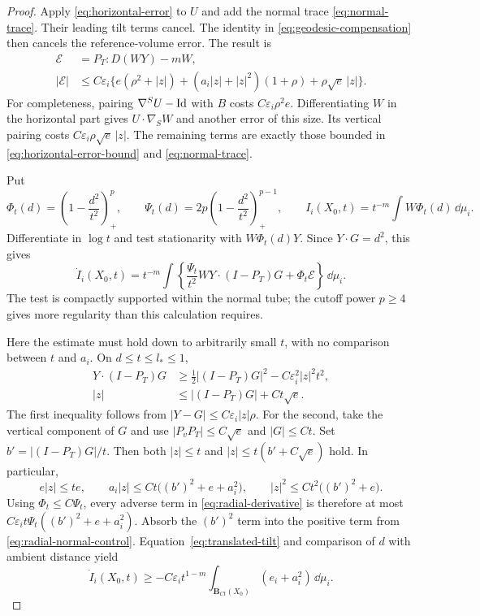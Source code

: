 \begin{proof}
Apply \eqref{eq:horizontal-error} to $U$ and add the normal trace
\eqref{eq:normal-trace}. Their leading tilt terms cancel. The identity
in \eqref{eq:geodesic-compensation} then cancels the reference-volume
error. The result is
\begin{equation}\label{eq:radial-error}
\begin{aligned}
 \mathcal E&=P_T:D(WY)-mW,\\
 |\mathcal E|&\le C\varepsilon_i\bigl\{
 e(\rho^2+|z|)+(a_i|z|+|z|^2)(1+\rho)
                         +\rho\sqrt e\,|z|\bigr\}.
\end{aligned}
\end{equation}
For completeness, pairing $\nabla^SU-\mathrm{Id}$ with $B$ costs
$C\varepsilon_i\rho^2e$. Differentiating $W$ in the horizontal part
gives $U\cdot\nabla_SW$ and another error of this size. Its vertical
pairing costs $C\varepsilon_i\rho\sqrt e\,|z|$. The remaining terms
are exactly those bounded in \eqref{eq:horizontal-error-bound} and
\eqref{eq:normal-trace}.

Put
\[
 \Phi_t(d)=\left(1-\frac{d^2}{t^2}\right)_+^p,
 \qquad \Psi_t(d)=2p\left(1-\frac{d^2}{t^2}\right)_+^{p-1},
 \qquad
 I_i(X_0,t)=t^{-m}\int W\Phi_t(d)\,\dd\mu_i.
\]
Differentiate in $\log t$ and test stationarity with
$W\Phi_t(d)Y$. Since $Y\cdot G=d^2$, this gives
\begin{equation}\label{eq:radial-derivative}
 \dot I_i(X_0,t)
 =t^{-m}\int\left\{
       \frac{\Psi_t}{t^2}W Y\cdot(I-P_T)G
                         +\Phi_t\mathcal E\right\}\,\dd\mu_i.
\end{equation}
The test is compactly supported within the normal tube; the cutoff power
$p\ge4$ gives more regularity than this calculation requires.

Here the estimate must hold down to arbitrarily small $t$, with no
comparison between $t$ and $a_i$. On $d\le t\le l_*\le1$,
\begin{equation}\label{eq:radial-normal-control}
\begin{aligned}
 Y\cdot(I-P_T)G&\ge\tfrac12|(I-P_T)G|^2
                              -C\varepsilon_i^2|z|^2t^2,\\
 |z|&\le |(I-P_T)G|+Ct\sqrt e.
\end{aligned}
\end{equation}
The first inequality follows from
$|Y-G|\le C\varepsilon_i|z|\rho$. For the second, take the vertical
component of $G$ and use $|P_vP_T|\le C\sqrt e$ and $|G|\le Ct$.
Set $b'=|(I-P_T)G|/t$. Then both $|z|\le t$ and
$|z|\le t(b'+C\sqrt e)$ hold. In particular,
\[
 e|z|\le te,\qquad
 a_i|z|\le Ct\bigl((b')^2+e+a_i^2\bigr),
 \qquad |z|^2\le Ct^2\bigl((b')^2+e\bigr).
\]
Using $\Phi_t\le C\Psi_t$, every adverse term in
\eqref{eq:radial-derivative} is therefore at most
$C\varepsilon_i t\Psi_t((b')^2+e+a_i^2)$.
Absorb the $(b')^2$ term into the positive term from
\eqref{eq:radial-normal-control}. Equation~\eqref{eq:translated-tilt}
and comparison of $d$ with ambient distance yield
\begin{equation}\label{eq:radial-almost-monotonicity}
 \dot I_i(X_0,t)\ge
 -C\varepsilon_i t^{1-m}
       \int_{\mathbf B_{Ct}(X_0)}(e_i+a_i^2)\,\dd\mu_i.
\end{equation}


\end{proof}
